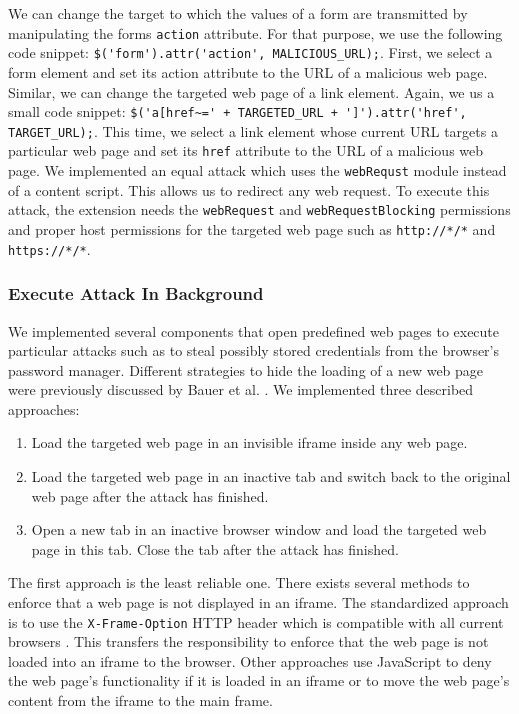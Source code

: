 	We can change the target to which the values of a form are transmitted by manipulating the forms \texttt{action} attribute. For that purpose, we use the following code snippet: \lstinline|$('form').attr('action', MALICIOUS_URL);|. First, we select a form element and set its action attribute to the URL of a malicious web page. Similar, we can change the targeted web page of a link element. Again, we us a small code snippet: \lstinline|$('a[href~=' + TARGETED_URL + ']').attr('href', TARGET_URL);|. This time, we select a link element whose current URL targets a particular web page and set its \texttt{href} attribute to the URL of a malicious web page. We implemented an equal attack which uses the \texttt{webRequst} module instead of a content script. This allows us to redirect any web request. To execute this attack, the extension needs the \texttt{webRequest} and \texttt{webRequestBlocking} permissions and proper host permissions for the targeted web page such as \texttt{http://*/*} and \texttt{https://*/*}. 
	
\subsubsection{Execute Attack In Background}
\label{sec:executeAttackInBackground}

	We implemented several components that open predefined web pages to execute particular attacks such as to steal possibly stored credentials from the browser's password manager. Different strategies to hide the loading of a new web page were previously discussed by Bauer et al. \cite{extensions:cns14}. We implemented three described approaches:
	
	\begin{enumerate}
		\item Load the targeted web page in an invisible iframe inside any web page.
		\item Load the targeted web page in an inactive tab and switch back to the original web page after the attack has finished.
		\item Open a new tab in an inactive browser window and load the targeted web page in this tab. Close the tab after the attack has finished.
	\end{enumerate} 
	
	The first approach is the least reliable one. There exists several methods to enforce that a web page is not displayed in an iframe. The standardized approach is to use the \texttt{X-Frame-Option} HTTP header which is compatible with all current browsers \cite{xFrameOptionsSpezification, xFrameOptionsCompability}. This transfers the responsibility to enforce that the web page is not loaded into an iframe to the browser. Other approaches use JavaScript to deny the web page's functionality if it is loaded in an iframe or to move the web page's content from the iframe to the main frame.
		
